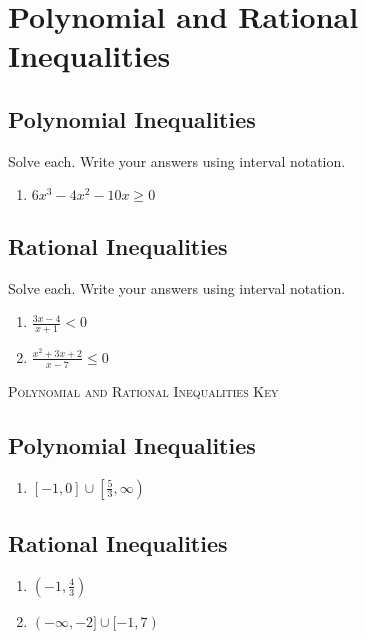 \chapter{Polynomial and Rational Inequalities}

\section{Polynomial Inequalities}

Solve each. Write your answers using interval notation.
\begin{enumerate}
\item $6x^3-4x^2-10x \geq 0$
\end{enumerate}

\section{Rational Inequalities}

Solve each. Write your answers using interval notation.
\begin{enumerate}
\setlength\itemsep{10pt}
\item $\frac{3x-4}{x+1}<0$
\item $\frac{x^2+3x+2}{x-7} \leq 0$
\end{enumerate}

\newpage

\textsc{Polynomial and Rational Inequalities Key}

\section*{Polynomial Inequalities}
\begin{enumerate}
    \item $[-1,0] \cup \left[\frac{5}{3}, \infty\right)$
\end{enumerate}
\section*{Rational Inequalities}
\begin{enumerate}
    \item $\left(-1, \frac{4}{3}\right)$
    \item $(-\infty,-2] \cup [-1, 7)$
\end{enumerate}
